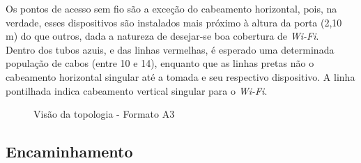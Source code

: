\documentclass[	DIV=calc,%
							paper=a4,%
							fontsize=12pt,%
							onecolumn]{scrartcl}	 					%
\begin{document}
Os pontos de acesso sem fio são a exceção do cabeamento horizontal, pois, na verdade, esses dispositivos são instalados mais próximo à altura da porta (2,10 m) do que outros, dada a natureza de desejar-se boa cobertura de \textit{Wi-Fi}.
\\

Dentro dos tubos azuis, e das linhas vermelhas, é esperado uma determinada população de cabos (entre 10 e 14), enquanto que as linhas pretas não o cabeamento horizontal singular até a tomada e seu respectivo dispositivo. A linha pontilhada indica cabeamento vertical singular para o \textit{Wi-Fi}.



\clearpage
\thispagestyle{empty}
\recalctypearea

\begin{figure}
	\noindent{}
	\caption{Visão da topologia - Formato A3}
	\label{fig3}
\end{figure}

\clearpage
{}
\recalctypearea


\subsection{Encaminhamento}
\end{document}
